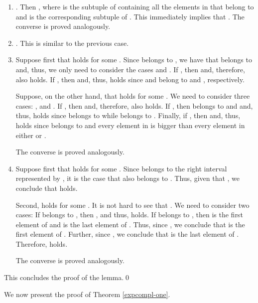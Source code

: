 \documentclass{LMCS}
\theoremstyle{plain}
\theoremstyle{definition}
\begin{document}
\begin{enumerate}[]

\item . Then , where  is the subtuple of  containing all the elements in  that
belong to  and  is the corresponding subtuple of
. This immediately implies that . The converse is proved analogously.

\item . This is similar to the previous
  case. 

\item Suppose first that  holds for some . Since  belongs to , we have that 
belongs to  and, thus, we only need to consider the cases
 and . If , then  and, therefore,  also
holds. If , then  and, thus,
 holds since  and  belong to 
and , respectively. 

Suppose, on the other hand, that  holds for some . We need to consider three cases: ,
 and . If , then  and, therefore,  also
holds. If , then  belongs to  and
 and, thus,  holds since 
belongs to  while  belongs to
. Finally, if , then  and, thus,  holds since  belongs
to  and every element in  is bigger than
every element in either  or .

The converse is proved analogously. 

\item Suppose first that  holds for some .  Since  belongs to the right interval represented by
, it is the case that  also belongs to
. Thus, given that , we conclude that  holds.

Second,  holds for some . It is not
hard to see that . 
We need to consider two cases: If  belongs to
, then , and thus,  holds. If
 belongs to , then 
 is the first element of  and
 is the last element of . Thus, since 
, we conclude that  is
the first element of . Further, since 
, 
we conclude that
 is the last element of . Therefore,
 holds.

The converse is proved analogously. 
\end{enumerate} 
This concludes the proof of the lemma.\qed

We now present the proof of Theorem \ref{expcompl-one}. 
\end{document}
